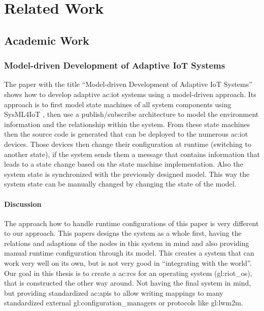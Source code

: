 \chapter{Related Work}
\label{chapter:related_work}

\section{Academic Work}

\subsection{Model-driven Development of Adaptive IoT Systems}

The paper with the title ``Model-driven Development of Adaptive IoT Systems''\cite{hussein2017model} shows how to develop adaptive \gls{ac:iot} systems using a model-driven approach.
Its approach is to first model state machines of all system components using SysML4IoT \cite{7592792}, then use a publish/subscribe architecture to model the environment information and the relationship within the system.
From these state machines then the source code is generated that can be deployed to the numerous \gls{ac:iot} devices.
Those devices then change their configuration at runtime (switching to another state), if the system sends them a message that contains information that leads to a state change based on the state machine implementation.
Also the system state is synchronized with the previously designed model.
This way the system state can be manually changed by changing the state of the model.

\subsubsection{Discussion}

The approach how to handle runtime configurations of this paper is very different to our approach.
This papers designs the system as a whole first, having the relations and adaptions of the nodes in this system in mind and also providing manual runtime configuration through its model.
This creates a system that can work very well on its own, but is not very good in ``integrating with the world''.
Our goal in this thesis is to create a \gls{ac:rcs} for an operating system (\gls{gl:riot_os}), that is constructed the other way around.
Not having the final system in mind, but providing standardized \glspl{ac:api} to allow writing mappings to many standardized external \glspl{gl:configuration_manager} or protocols like \gls{gl:lwm2m}.

